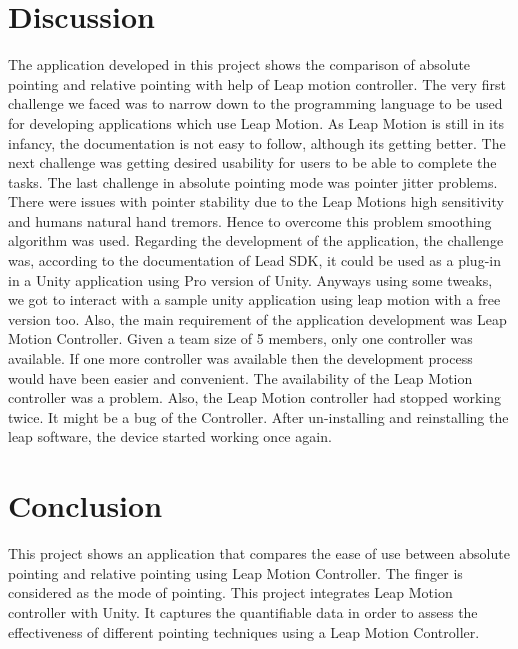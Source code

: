 \documentclass[titlepage]{article}
\begin{document}
\section{Discussion}
The application developed in this project shows the comparison of absolute pointing and relative pointing with help of Leap motion controller. The very first challenge we faced was to narrow down to the programming language to be used for developing applications which use Leap Motion. As Leap Motion is still in its infancy, the documentation is not easy to follow, although its getting better. The next challenge was getting desired usability for users to be able to complete the tasks.  The last challenge in absolute pointing mode was pointer jitter problems. There were issues with pointer stability due to the Leap Motions high sensitivity and humans natural hand tremors. Hence to overcome this problem smoothing algorithm was used. Regarding the development of the application, the challenge was, according to the documentation of Lead SDK, it could be used as a plug-in in a Unity application using Pro version of Unity. Anyways using some tweaks, we got to interact with a sample unity application using leap motion with a free version too. Also, the main requirement of the application development was Leap Motion Controller. Given a team size of 5 members, only one controller was available. If one more controller was available then the development process would have been easier and convenient. The availability of the Leap Motion controller was a problem. Also, the Leap Motion controller had stopped working twice. It might be a bug of the Controller. After un-installing and reinstalling the leap software, the device started working once again.



\section{Conclusion}
This project shows an application that compares the ease of use between absolute pointing and relative pointing using Leap Motion Controller. The finger is considered as the mode of pointing. This project integrates Leap Motion controller with Unity. It captures the quantifiable data in order to assess the effectiveness of different pointing techniques using a Leap Motion Controller. 







\end{document}
